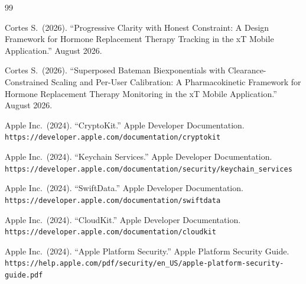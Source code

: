 \documentclass[11pt,a4paper]{article}
\begin{document}
\begin{thebibliography}{99}

Cortes S.\ (2026). ``Progressive Clarity with Honest Constraint: A Design
Framework for Hormone Replacement Therapy Tracking in the xT Mobile
Application.'' August 2026.

Cortes S.\ (2026). ``Superposed Bateman Biexponentials with
Clearance-Constrained Scaling and Per-User Calibration: A Pharmacokinetic
Framework for Hormone Replacement Therapy Monitoring in the xT Mobile
Application.'' August 2026.

Apple Inc.\ (2024). ``CryptoKit.'' Apple Developer Documentation.
\verb|https://developer.apple.com/documentation/cryptokit|

Apple Inc.\ (2024). ``Keychain Services.'' Apple Developer Documentation.
\verb|https://developer.apple.com/documentation/security/keychain_services|

Apple Inc.\ (2024). ``SwiftData.'' Apple Developer Documentation.
\verb|https://developer.apple.com/documentation/swiftdata|

Apple Inc.\ (2024). ``CloudKit.'' Apple Developer Documentation.
\verb|https://developer.apple.com/documentation/cloudkit|

Apple Inc.\ (2024). ``Apple Platform Security.'' Apple Platform Security
Guide. \verb|https://help.apple.com/pdf/security/en_US/apple-platform-security-guide.pdf|

\end{thebibliography}
\end{document}
